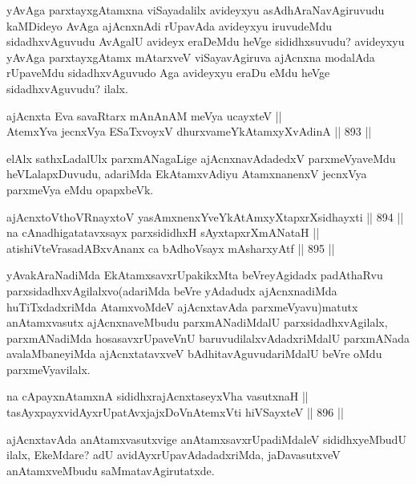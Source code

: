 \begin{artha}
yAvAga parxtayxgAtamxna viSayadalilx avideyxyu asAdhAraNavAgiruvudu kaMDideyo AvAga ajAcnxnAdi rUpavAda avideyxyu iruvudeMdu sidadhxvAguvudu AvAgalU avideyx eraDeMdu heVge sididhxsuvudu? avideyxyu yAvAga parxtayxgAtamx mAtarxveV viSayavAgiruva ajAcnxna modalAda rUpaveMdu sidadhxvAguvudo Aga avideyxyu eraDu eMdu heVge sidadhxvAguvudu? ilalx.
\end{artha}

\begin{shl}
ajAcnxta Eva savaRtarx mAnAnAM meVya ucayxteV || \\
AtemxYva jecnxVya ESaTxvoyxV dhurxvameYkAtamxyXvAdinA \hfill || 893 ||  
\end{shl}

\begin{artha}
elAlx sathxLadalUlx parxmANagaLige ajAcnxnavAdadedxV parxmeVyaveMdu heVLalapxDuvudu, adariMda EkAtamxvAdiyu AtamxnanenxV jecnxVya parxmeVya eMdu opapxbeVk.
\end{artha}

\begin{shl}
ajAcnxtoV\s thoVR\s nayxtoV yasAmxnenxYveYkAtAmxyXtapxrXsidhayxti \hfill || 894 ||  \\
na cAnadhigatatavxsayx parxsididhxH sAyxtapxrXmANataH || \\
atishiVteVrasadABxvAnanx ca bAdhoV\s sayx mAsharxyAtf \hfill || 895 ||  
\end{shl}

\begin{artha}
yAvakAraNadiMda EkAtamxsavxrUpakikxMta beVreyAgidadx padAthaRvu parxsidadhxvAgilalxvo(adariMda beVre yAdadudx ajAcnxnadiMda huTiTxdadxriMda AtamxvoMdeV ajAcnxtavAda parxmeVyavu)matutx anAtamxvasutx ajAcnxnaveMbudu parxmANadiMdalU parxsidadhxvAgilalx, parxmANadiMda hosasavxrUpaveVnU baruvudilalxvAdadxriMdalU parxmANada avalaMbaneyiMda ajAcnxtatavxveV bAdhitavAguvudariMdalU beVre oMdu parxmeVyavilalx.
\end{artha}

\begin{shl}
na cApayxnAtamxnA sididhxrajAcnxtaseyxVha vasutxnaH || \\
tasAyxpayxvidAyxrUpatAvxjajxDoV\s nAtemxVti hiVSayxteV \hfill || 896 ||  
\end{shl}

\begin{artha}
ajAcnxtavAda anAtamxvasutxvige anAtamxsavxrUpadiMdaleV sididhxyeMbudU ilalx, EkeMdare? adU avidAyxrUpavAdadadxriMda, jaDavasutxveV anAtamxveMbudu saMmatavAgirutatxde.
\end{artha}

